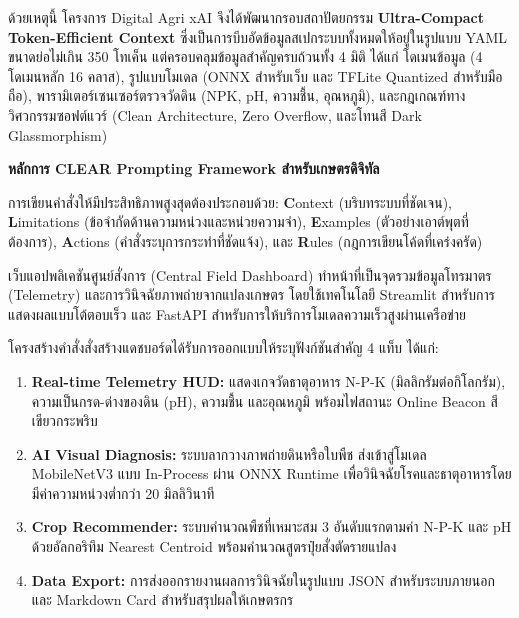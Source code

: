 ด้วยเหตุนี้ โครงการ Digital Agri xAI จึงได้พัฒนากรอบสถาปัตยกรรม \textbf{Ultra-Compact Token-Efficient Context} ซึ่งเป็นการบีบอัดข้อมูลสเปกระบบทั้งหมดให้อยู่ในรูปแบบ YAML ขนาดย่อไม่เกิน 350 โทเค็น แต่ครอบคลุมข้อมูลสำคัญครบถ้วนทั้ง 4 มิติ ได้แก่ โดเมนข้อมูล (4 โดเมนหลัก 16 คลาส), รูปแบบโมเดล (ONNX สำหรับเว็บ และ TFLite Quantized สำหรับมือถือ), พารามิเตอร์เซนเซอร์ตรวจวัดดิน (NPK, pH, ความชื้น, อุณหภูมิ), และกฎเกณฑ์ทางวิศวกรรมซอฟต์แวร์ (Clean Architecture, Zero Overflow, และโทนสี Dark Glassmorphism)

\begin{academicNote}
\textbf{หลักการ CLEAR Prompting Framework สำหรับเกษตรดิจิทัล}\par
การเขียนคำสั่งให้มีประสิทธิภาพสูงสุดต้องประกอบด้วย:
\textbf{C}ontext (บริบทระบบที่ชัดเจน), \textbf{L}imitations (ข้อจำกัดด้านความหน่วงและหน่วยความจำ), \textbf{E}xamples (ตัวอย่างเอาต์พุตที่ต้องการ), \textbf{A}ctions (คำสั่งระบุการกระทำที่ชัดแจ้ง), และ \textbf{R}ules (กฎการเขียนโค้ดที่เคร่งครัด)
\end{academicNote}


เว็บแอปพลิเคชันศูนย์สั่งการ (Central Field Dashboard) ทำหน้าที่เป็นจุดรวมข้อมูลโทรมาตร (Telemetry) และการวินิจฉัยภาพถ่ายจากแปลงเกษตร โดยใช้เทคโนโลยี Streamlit สำหรับการแสดงผลแบบโต้ตอบเร็ว และ FastAPI สำหรับการให้บริการโมเดลความเร็วสูงผ่านเครือข่าย

โครงสร้างคำสั่งสั่งสร้างแดชบอร์ดได้รับการออกแบบให้ระบุฟังก์ชันสำคัญ 4 แท็บ ได้แก่:
\begin{enumerate}
    \item \textbf{Real-time Telemetry HUD:} แสดงเกจวัดธาตุอาหาร N-P-K (มิลลิกรัมต่อกิโลกรัม), ความเป็นกรด-ด่างของดิน (pH), ความชื้น และอุณหภูมิ พร้อมไฟสถานะ Online Beacon สีเขียวกระพริบ
    \item \textbf{AI Visual Diagnosis:} ระบบลากวางภาพถ่ายดินหรือใบพืช ส่งเข้าสู่โมเดล MobileNetV3 แบบ In-Process ผ่าน ONNX Runtime เพื่อวินิจฉัยโรคและธาตุอาหารโดยมีค่าความหน่วงต่ำกว่า 20 มิลลิวินาที
    \item \textbf{Crop Recommender:} ระบบคำนวณพืชที่เหมาะสม 3 อันดับแรกตามค่า N-P-K และ pH ด้วยอัลกอริทึม Nearest Centroid พร้อมคำนวณสูตรปุ๋ยสั่งตัดรายแปลง
    \item \textbf{Data Export:} การส่งออกรายงานผลการวินิจฉัยในรูปแบบ JSON สำหรับระบบภายนอก และ Markdown Card สำหรับสรุปผลให้เกษตรกร
\end{enumerate}


